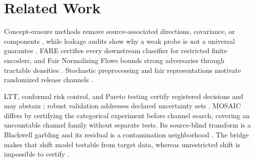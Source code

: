\section{Related Work}

Concept-erasure methods remove source-associated directions, covariance, or
components \citep{ravfogel2020null,ravfogel2022linear,belrose2023leace,
jourdan2023taco,avitan2026mance}, while leakage audits show why a weak probe is
not a universal guarantee \citep{pimentel2020probing,elazar2021amnesic,
chowdhury2025limits}. FARE certifies every downstream classifier for restricted
finite encoders, and Fair Normalizing Flows bounds strong adversaries through
tractable densities \citep{jovanovic2023fare,balunovic2022fnf}. Stochastic
preprocessing and fair representations motivate randomized release channels
\citep{calmon2017preprocessing,makhdoumi2014privacyfunnel,agarwal2024randomization}.

LTT, conformal risk control, and Pareto testing certify registered decisions and
may abstain \citep{bates2021rcps,angelopoulos2025ltt,angelopoulos2024crc,
laufer2023pareto}; robust validation addresses declared uncertainty sets
\citep{tibshirani2019covariate,cauchois2024robust}. MOSAIC differs by certifying
the categorical experiment before channel search, covering an uncountable
channel family without separate tests. Its source-blind transform is a
Blackwell garbling and its residual is a contamination neighborhood
\citep{blackwell1953experiments,lecam1964sufficiency,torgersen1991experiments,
huber1964robust}. The bridge makes that shift model testable from target data,
whereas unrestricted shift is impossible to certify
\citep{bendavid2010impossibility,klivans2024testable,chandrasekaran2025learning}.

